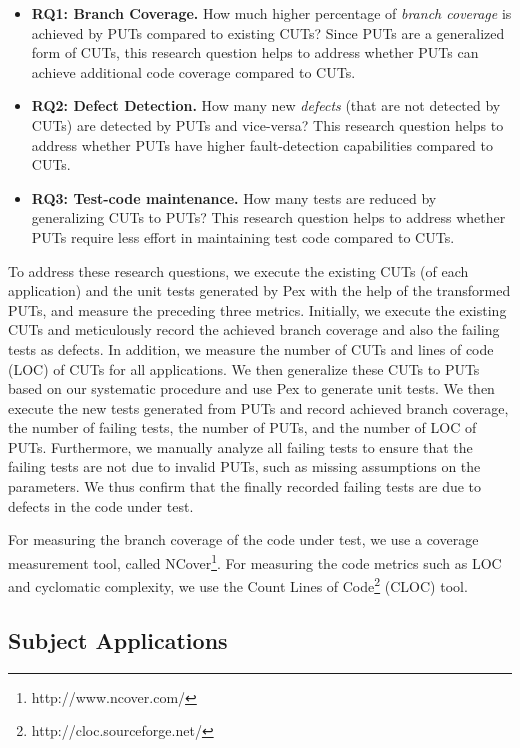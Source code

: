 \begin{itemize}
	\item \textbf{RQ1: Branch Coverage.} How much higher percentage of \emph{branch coverage} is achieved by PUTs compared to existing CUTs? Since PUTs are a generalized form of CUTs, this research question helps to address whether PUTs can achieve additional code coverage compared to CUTs.
	\item \textbf{RQ2: Defect Detection.} How many new \emph{defects} (that are not detected by CUTs) are detected by PUTs and vice-versa? This research question helps to address whether PUTs have higher fault-detection capabilities compared to CUTs.
	\item \textbf{RQ3: Test-code maintenance.} How many tests are reduced by generalizing CUTs to PUTs? This research question helps to address whether PUTs require less effort in maintaining test code compared to CUTs.
\end{itemize}

To address these research questions, we execute the existing CUTs (of each application) and the unit tests generated by Pex with the help of the transformed PUTs, and measure the preceding three metrics. Initially, we execute the existing CUTs and meticulously record the achieved branch coverage and also the failing tests as defects. In addition, we measure the number of CUTs and lines of code (LOC) of CUTs for all applications. We then generalize these CUTs to PUTs based on our systematic procedure and use Pex to generate unit tests. We then execute the new tests generated from PUTs and record achieved branch coverage, the number of failing tests, the number of PUTs, and the number of LOC of PUTs. Furthermore, we manually analyze all failing tests to ensure that the failing tests are not due to invalid PUTs, such as missing assumptions on the parameters. We thus confirm that the finally recorded failing tests are due to defects in the code under test.

For measuring the branch coverage of the code under test, we use a coverage measurement tool, called NCover\footnote{http://www.ncover.com/}. For measuring the code metrics such as LOC and cyclomatic complexity, we use the Count Lines of Code\footnote{http://cloc.sourceforge.net/} (CLOC) tool.

\subsection{Subject Applications}

